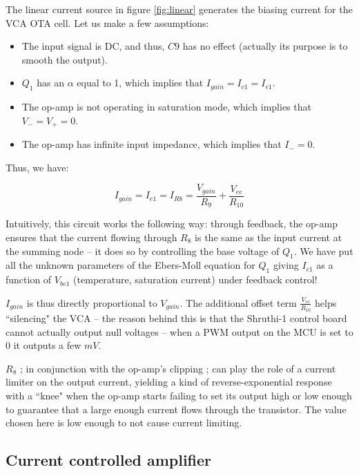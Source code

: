 \documentclass[a4paper,11pt]{article}
\begin{document}
The linear current source in figure \ref{fig:linear} generates the biasing current for the VCA OTA cell. Let us make a few assumptions:
\begin{itemize}
\item The input signal is DC, and thus, $C9$ has no effect (actually its purpose is to smooth the output).
\item $Q_1$ has an $\alpha$ equal to 1, which implies that $I_{gain} = I_{c1} = I_{e1}$.
\item The op-amp is not operating in saturation mode, which implies that $V_- = V_+ = 0$.
\item The op-amp has infinite input impedance, which implies that $I_- = 0$.
\end{itemize}

Thus, we have:

\begin{equation}
I_{gain} = I_{e1} = I_{R8} = \frac{V_{gain}}{R_9} + \frac{V_{ee}}{R_{10}}
\end{equation}

Intuitively, this circuit works the following way: through feedback, the op-amp ensures that the current flowing through $R_8$ is the same as the input current at the summing node -- it does so by controlling the base voltage of $Q_1$. We have put all the unknown parameters of the Ebers-Moll equation for $Q_1$ giving $I_{c1}$ as a function of $V_{be1}$ (temperature, saturation current) under feedback control!

$I_{gain}$ is thus directly proportional to $V_{gain}$. The additional offset term $\frac{V_{ee}}{R_{10}}$ helps ``silencing" the VCA -- the reason behind this is that the Shruthi-1 control board cannot actually output null voltages -- when a PWM output on the MCU is set to 0 it outputs a few $mV$.

$R_8$ ; in conjunction with the op-amp's clipping ; can play the role of a current limiter on the output current, yielding a kind of reverse-exponential response with a ``knee" when the op-amp starts failing to set its output high or low enough to guarantee that a large enough current flows through the transistor. The value chosen here is low enough to not cause current limiting.

\subsection{Current controlled amplifier}
\end{document}

